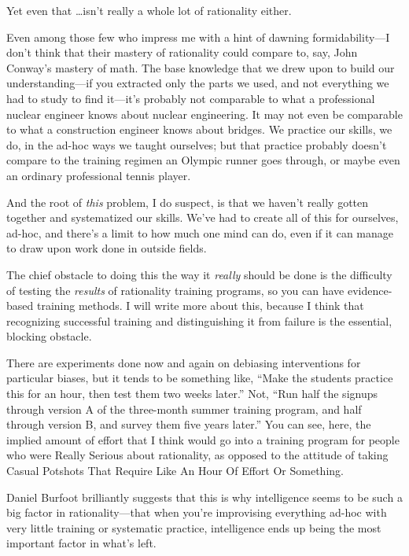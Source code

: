 {
 Yet even that \ldots isn't really a whole lot of
rationality either.}

{
 Even among those few who impress me with a hint of dawning
formidability---I don't think that their mastery of
rationality could compare to, say, John Conway's
mastery of math. The base knowledge that we drew upon to build our
understanding---if you extracted only the parts we used, and not
everything we had to study to find it---it's probably
not comparable to what a professional nuclear engineer knows about
nuclear engineering. It may not even be comparable to what a
construction engineer knows about bridges. We practice our skills, we
do, in the ad-hoc ways we taught ourselves; but that practice probably
doesn't compare to the training regimen an Olympic
runner goes through, or maybe even an ordinary professional tennis
player.}

{
 And the root of \textit{this} problem, I do suspect, is that we
haven't really gotten together and systematized our
skills. We've had to create all of this for ourselves,
ad-hoc, and there's a limit to how much one mind can
do, even if it can manage to draw upon work done in outside fields.}

{
 The chief obstacle to doing this the way it \textit{really} should
be done is the difficulty of testing the \textit{results} of
rationality training programs, so you can have evidence-based training
methods. I will write more about this, because I think that recognizing
successful training and distinguishing it from failure is the
essential, blocking obstacle.}

{
 There are experiments done now and again on debiasing
interventions for particular biases, but it tends to be something like,
``Make the students practice this for an hour, then
test them two weeks later.'' Not,
``Run half the signups through version A of the
three-month summer training program, and half through version B, and
survey them five years later.'' You can see, here,
the implied amount of effort that I think would go into a training
program for people who were Really Serious about rationality, as
opposed to the attitude of taking Casual Potshots That Require Like An
Hour Of Effort Or Something.}

{
 Daniel Burfoot brilliantly suggests that this is why intelligence
seems to be such a big factor in rationality---that when
you're improvising everything ad-hoc with very little
training or systematic practice, intelligence ends up being the most
important factor in what's left.}

